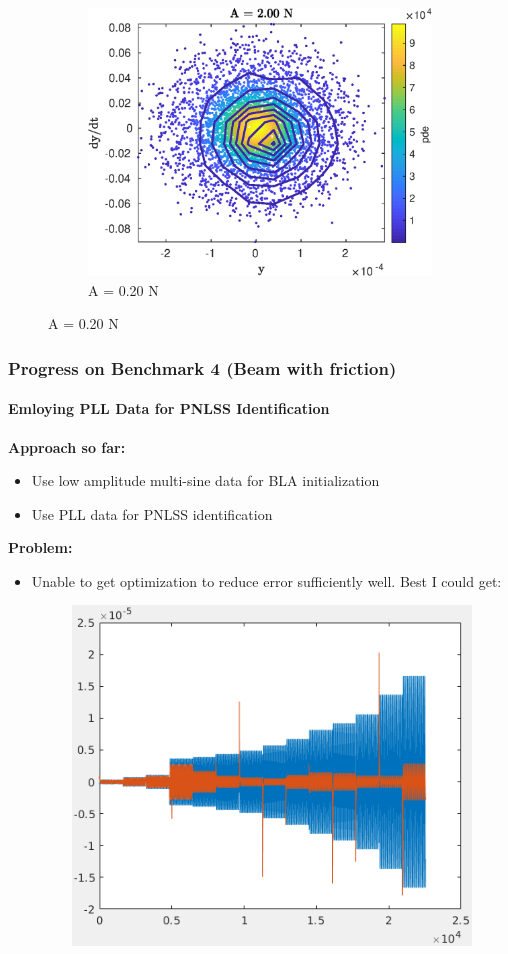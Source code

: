 \documentclass[aspectratio=169]{beamer}
\begin{document}
\begin{frame}[allowframebreaks]
\begin{figure}[!h]
\begin{subfigure}{0.2\linewidth}
      \includegraphics[width=\linewidth]{../../benchmark4/extabs_fig/b4_tdata_kern_famp20}
      \caption{A = 0.20 N}
    \end{subfigure}%
  \end{figure}
\end{frame}

\begin{frame}
  \frametitle{Progress on Benchmark 4 (Beam with friction)}
  \framesubtitle{Emloying PLL Data for PNLSS Identification}
  \textbf{Approach so far:}
  \begin{itemize}
  \item Use low amplitude multi-sine data for BLA initialization
  \item Use PLL data for PNLSS identification
  \end{itemize}
  \textbf{Problem:}
  \begin{itemize}
  \item Unable to get optimization to reduce error sufficiently
    well. Best I could get:
    \begin{figure}[!h]
      \centering
      \includegraphics[width=0.3\linewidth]{FIGS/pnlss_pll}
    \end{figure}
  \end{itemize}
\end{frame}
\end{document}
